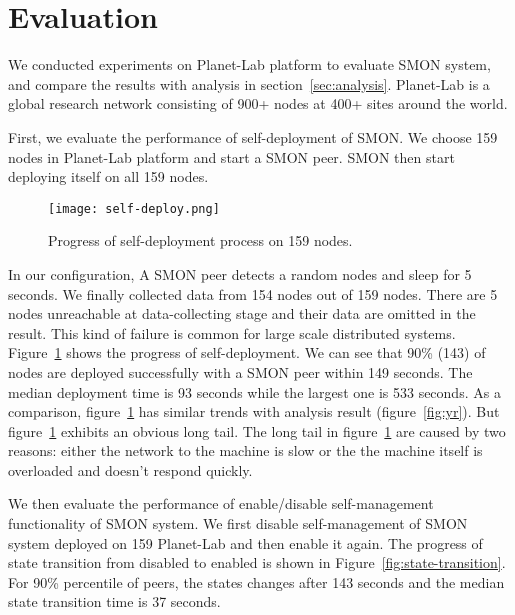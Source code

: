 \section{Evaluation}
\label{sec:eval}

We conducted experiments on Planet-Lab platform to evaluate
SMON system, and compare the results with analysis in
section~\ref{sec:analysis}. Planet-Lab is a global research network
consisting of 900+ nodes at 400+ sites around the
world.

%

First, we evaluate the performance of self-deployment of
SMON.  We choose 159 nodes in Planet-Lab platform and start
a SMON peer. SMON then start deploying itself on all 159
nodes.

\begin{figure}
\centering
\texttt{[image: self-deploy.png]}
\caption{Progress of self-deployment process on 159
nodes.}
\label{fig:self-deploy}
\end{figure}

In our configuration, A SMON peer detects a random nodes and
sleep for 5 seconds. We finally collected data from 154
nodes out of 159 nodes. There are 5 nodes unreachable at
data-collecting stage and their data are omitted in the
result. This kind of failure is common for large scale
distributed systems.  Figure~\ref{fig:self-deploy} shows the
progress of self-deployment. We can see that 90\% (143) of
nodes are deployed successfully with a SMON peer within 149
seconds. The median deployment time is 93 seconds while the
largest one is 533 seconds. As a comparison,
figure~\ref{fig:self-deploy} has similar trends with
analysis result (figure~\ref{fig:yr}). But
figure~\ref{fig:self-deploy} exhibits an obvious long tail.
The long tail in figure~\ref{fig:self-deploy} are caused by
two reasons: either the network to the machine is slow or
the the machine itself is overloaded and doesn't respond
quickly.

We then evaluate the performance of enable/disable
self-management functionality of SMON system. We first
disable self-management of SMON system deployed on 159
Planet-Lab and then enable it again. The progress of state
transition from disabled to enabled is shown in
Figure~\ref{fig:state-transition}. For 90\%
percentile of peers, the states changes after 143
seconds and the median state transition time is 37 seconds.

